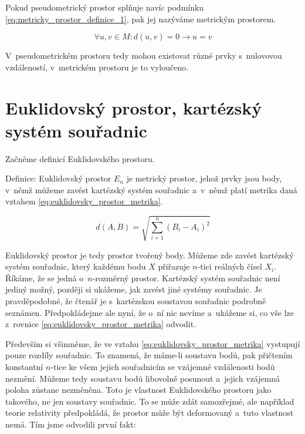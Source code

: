 Pokud pseudometrický prostor splňuje navíc podmínku \eqref{eq:metricky_prostor_definice_1}, pak jej nazýváme metrickým prostorem.

\begin{equation}
\label{eq:metricky_prostor_definice_1}
\forall u, v \in M : d(u, v) = 0 \rightarrow u = v
\end{equation}

V~pseudometrickém prostoru tedy mohou existovat různé prvky s~nulovovou vzdáleností, v~metrickém prostoru je to vyloučeno.

\section{Euklidovský prostor, kartézský systém souřadnic}

Začněme definicí Euklidovského prostoru.

\begin{fact}
Definice: Euklidovský prostor \(E_n\) je metrický prostor, jehož prvky jsou body, v~němž můžeme zavést kartézský systém souřadnic a~v~němž platí metrika daná vztahem \eqref{eq:euklidovsky_prostor_metrika}.

\begin{equation}
\label{eq:euklidovsky_prostor_metrika}
d(A, B) = \sqrt{\sum_{i=1}^{n} (B_i - A_i)^2}
\end{equation}
\end{fact}

Euklidovský prostor je tedy prostor tvořený body. Můžeme zde zavést kartézský systém souřadnic, který každému bodu \(X\) přiřazuje \(n\)-tici reálných čísel \(X_i\). Říkáme, že se jedná o~\(n\)-rozměrný prostor.
Kartézský systém souřadnic není jediný možný, později si ukážeme, jak zavést jiné systémy souřadnic. Je pravděpodobné, že čtenář je s~kartézskou soustavou souřadnic podrobně seznámen. Předpokládejme ale nyní,
že o~ní nic nevíme a~ukážeme si, co vše lze z~rovnice \eqref{eq:euklidovsky_prostor_metrika} odvodit.

Především si všimněme, že ve vztahu \eqref{eq:euklidovsky_prostor_metrika} vystupují pouze rozdíly souřadnic. To znamená, že máme-li soustavu bodů,
pak přičtením konstantní \(n\)-tice ke všem jejich souřadnicím se vzájemné vzdálenosti bodů nezmění. Můžeme tedy soustavu bodů libovolně posunout a~jejich vzájemná poloha zůstane nezměněna. Toto je vlastnost Euklidovského
prostoru jako takového, ne jen soustavy souřadnic. To se může zdát samozřejmé, ale například teorie relativity předpokládá, že prostor může být deformovaný a~tuto vlastnost nemá. Tím jsme odvodili první fakt:

